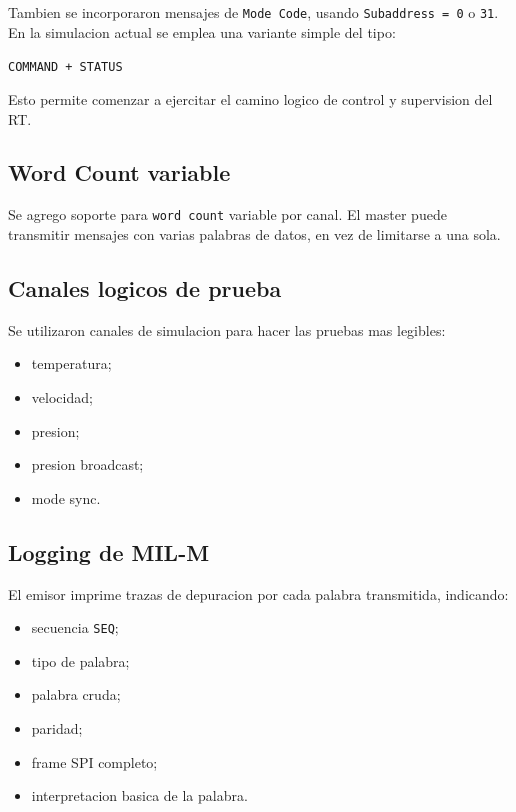 \documentclass[12pt,a4paper]{article}
\begin{document}
Tambien se incorporaron mensajes de \texttt{Mode Code}, usando \texttt{Subaddress = 0} o
\texttt{31}. En la simulacion actual se emplea una variante simple del tipo:

\begin{center}
\texttt{COMMAND + STATUS}
\end{center}

Esto permite comenzar a ejercitar el camino logico de control y supervision del RT.

\subsection{Word Count variable}

Se agrego soporte para \texttt{word count} variable por canal. El master puede transmitir mensajes
con varias palabras de datos, en vez de limitarse a una sola.

\subsection{Canales logicos de prueba}

Se utilizaron canales de simulacion para hacer las pruebas mas legibles:

\begin{itemize}
    \item temperatura;
    \item velocidad;
    \item presion;
    \item presion broadcast;
    \item mode sync.
\end{itemize}

\subsection{Logging de MIL-M}

El emisor imprime trazas de depuracion por cada palabra transmitida, indicando:

\begin{itemize}
    \item secuencia \texttt{SEQ};
    \item tipo de palabra;
    \item palabra cruda;
    \item paridad;
    \item frame SPI completo;
    \item interpretacion basica de la palabra.
\end{itemize}
\end{document}
